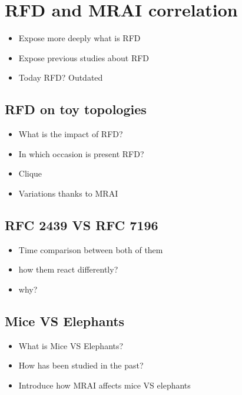 \chapter{RFD and MRAI correlation}
\label{cha:bgp_rfd}

\begin{itemize}
    \item Expose more deeply what is RFD
    \item Expose previous studies about RFD
    \item Today RFD? Outdated
\end{itemize}

\section{RFD on toy topologies}
\label{sec:bgp_rfd_toy}

\begin{itemize}
    \item What is the impact of RFD?
    \item In which occasion is present RFD?
    \item Clique
    \item Variations thanks to MRAI
\end{itemize}

\section{RFC 2439 VS RFC 7196}
\label{sec:bgp_rfd_comparison}

\begin{itemize}
    \item Time comparison between both of them
    \item how them react differently?
    \item why?
\end{itemize}

\section{Mice VS Elephants}
\label{sec:bgp_rfd_mice_vs_elephants}

\begin{itemize}
    \item What is Mice VS Elephants?
    \item How has been studied in the past?
    \item Introduce how MRAI affects mice VS elephants
\end{itemize}